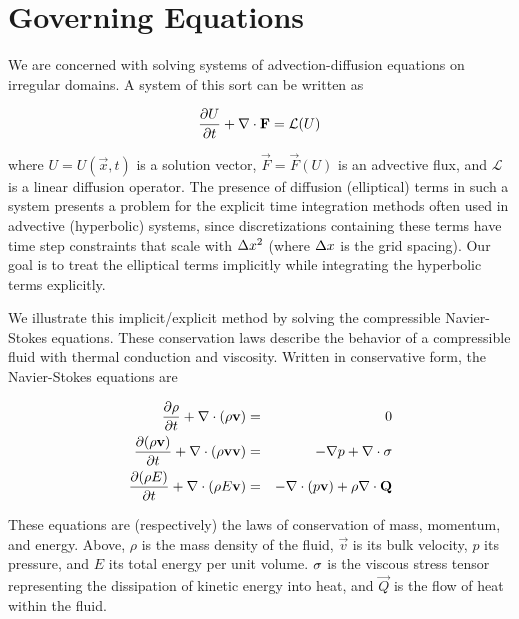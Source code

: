 \section{Governing Equations\label{sec:Equations}}

We are concerned with solving systems of advection-diffusion equations on 
irregular domains. A system of this sort can be written as

\begin{equation}
\frac{\partial U}{\partial t} + \nabla\cdot{\mathbf{F}} = \mathcal{L}(U) \label{eq:advectionDiffusion}
\end{equation}

\noindent
where $U = U(\vec{x}, t)$ is a solution vector, $\vec{F} = \vec{F}(U)$ is an 
advective flux, and $\mathcal{L}$ is a linear diffusion operator. The presence 
of diffusion (elliptical) terms in such a system presents a problem for the
explicit time integration methods often used in advective (hyperbolic) systems, 
since discretizations containing these terms have time step constraints 
that scale with $\Delta x^2$ (where $\Delta x$ is the grid spacing). Our goal is to 
treat the elliptical terms implicitly while integrating the hyperbolic terms
explicitly.

We illustrate this implicit/explicit method by solving the compressible 
Navier-Stokes equations. These conservation laws describe the behavior of a 
compressible fluid with thermal conduction and viscosity. Written
in conservative form, the Navier-Stokes equations are

\begin{eqnarray}
\frac{\partial \rho}{\partial t} + \nabla\cdot{(\rho \mathbf{v})} &=& 0 \notag \\ 
\frac{\partial (\rho \mathbf{v})}{\partial t} + \nabla\cdot{(\rho \mathbf{v}\mathbf{v})} &=& -\nabla{p} + \nabla\cdot{\mathbf{\sigma}} \label{eq:CNS} \\
\frac{\partial (\rho E)}{\partial t} + \nabla\cdot{(\rho E \mathbf{v})} &=& -\nabla\cdot{(p\mathbf{v})} + \rho\nabla\cdot{\mathbf{Q}} \notag
\end{eqnarray}

\noindent
These equations are (respectively) the laws of conservation of mass, momentum, 
and energy. Above, $\rho$ is the mass density of the fluid, $\vec{v}$ is its 
bulk velocity, $p$ its pressure, and $E$ its total energy per unit volume. 
$\mathbf{\sigma}$ is the viscous stress tensor representing the dissipation of 
kinetic energy into heat, and $\vec{Q}$ is the flow of heat within the fluid. 

